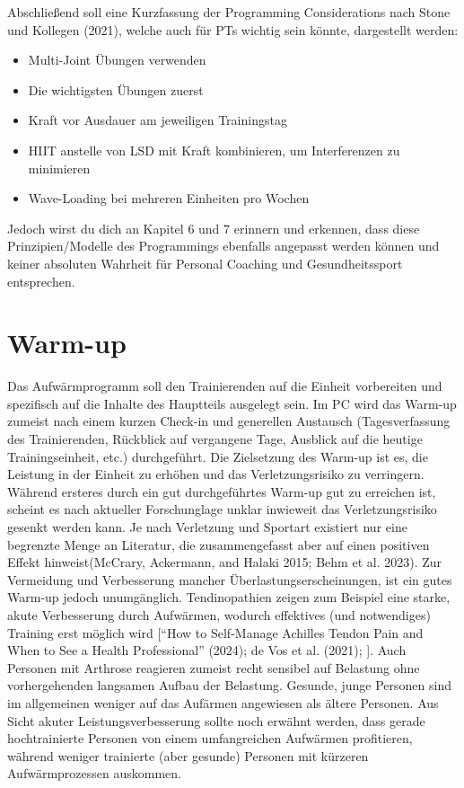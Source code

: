 \documentclass[
  letterpaper,
  DIV=11,
  numbers=noendperiod]{scrreprt}
\providecommand{\tightlist}{%
  \setlength{\itemsep}{0pt}\setlength{\parskip}{0pt}}
\begin{document}
Abschließend soll eine Kurzfassung der Programming Considerations nach
Stone und Kollegen (2021), welche auch für PTs wichtig sein könnte,
dargestellt werden:

\begin{itemize}
\tightlist
\item
  Multi-Joint Übungen verwenden
\item
  Die wichtigsten Übungen zuerst
\item
  Kraft vor Ausdauer am jeweiligen Trainingstag
\item
  HIIT anstelle von LSD mit Kraft kombinieren, um Interferenzen zu
  minimieren
\item
  Wave-Loading bei mehreren Einheiten pro Wochen
\end{itemize}

Jedoch wirst du dich an Kapitel 6 und 7 erinnern und erkennen, dass
diese Prinzipien/Modelle des Programmings ebenfalls angepasst werden
können und keiner absoluten Wahrheit für Personal Coaching und
Gesundheitssport entsprechen.

\section{Warm-up}\label{sec-warm-up}

Das Aufwärmprogramm soll den Trainierenden auf die Einheit vorbereiten
und spezifisch auf die Inhalte des Hauptteils ausgelegt sein. Im PC wird
das Warm-up zumeist nach einem kurzen Check-in und generellen Austausch
(Tagesverfassung des Trainierenden, Rückblick auf vergangene Tage,
Ausblick auf die heutige Trainingseinheit, etc.) durchgeführt. Die
Zielsetzung des Warm-up ist es, die Leistung in der Einheit zu erhöhen
und das Verletzungsrisiko zu verringern. Während ersteres durch ein gut
durchgeführtes Warm-up gut zu erreichen ist, scheint es nach aktueller
Forschunglage unklar inwieweit das Verletzungsrisiko gesenkt werden
kann. Je nach Verletzung und Sportart existiert nur eine begrenzte Menge
an Literatur, die zusammengefasst aber auf einen positiven Effekt
hinweist(McCrary, Ackermann, and Halaki 2015; Behm et al. 2023). Zur
Vermeidung und Verbesserung mancher Überlastungserscheinungen, ist ein
gutes Warm-up jedoch unumgänglich. Tendinopathien zeigen zum Beispiel
eine starke, akute Verbesserung durch Aufwärmen, wodurch effektives (und
notwendiges) Training erst möglich wird {[}{``How to {Self-Manage
Achilles Tendon Pain} and {When} to {See} a {Health Professional}''}
(2024); de Vos et al. (2021); {]}. Auch Personen mit Arthrose reagieren
zumeist recht sensibel auf Belastung ohne vorhergehenden langsamen
Aufbau der Belastung. Gesunde, junge Personen sind im allgemeinen
weniger auf das Aufärmen angewiesen als ältere Personen. Aus Sicht
akuter Leistungsverbesserung sollte noch erwähnt werden, dass gerade
hochtrainierte Personen von einem umfangreichen Aufwärmen profitieren,
während weniger trainierte (aber gesunde) Personen mit kürzeren
Aufwärmprozessen auskommen.
\end{document}
